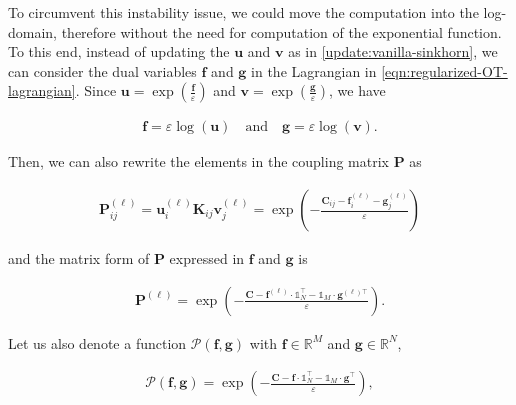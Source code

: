 To circumvent this instability issue, we could move the computation into the log-domain,
therefore without the need for computation of the exponential function.
To this end, instead of updating the $\mathbf{u}$ and $\mathbf{v}$ as in \cref{update:vanilla-sinkhorn},
we can consider the dual variables $\mathbf{f}$ and $\mathbf{g}$ in the Lagrangian in \cref{eqn:regularized-OT-lagrangian}.
Since $\mathbf{u} = \exp \left(\frac{\mathbf{f}}{\varepsilon}\right)$
and $\mathbf{v} = \exp \left(\frac{\mathbf{g}}\varepsilon\right)$, we have

\begin{equation}\label{eqn:fg-expression-as-uv}
  \begin{aligned}
    \mathbf{f} = \varepsilon \log(\mathbf{u})
    \quad\text{and}\quad
    \mathbf{g} = \varepsilon \log(\mathbf{v}).
  \end{aligned}
\end{equation}

Then, we can also rewrite the elements in the coupling matrix $\mathbf{P}$ as

\begin{equation*}
  \begin{aligned}
    \mathbf{P}_{ij}^{(\ell)}
    = \mathbf{u}_i^{(\ell)} \mathbf{K}_{ij} \mathbf{v}_j^{(\ell)}
    = \exp \left(
    -\frac{\mathbf{C}_{ij} - \mathbf{f}^{(\ell)}_i - \mathbf{g}^{(\ell)}_j}{\varepsilon}
    \right)
  \end{aligned}
\end{equation*}

and the matrix form of $\mathbf{P}$ expressed in $\mathbf{f}$ and $\mathbf{g}$ is

\begin{equation}\label{eqn:optimal-coupling-fg}
  \begin{aligned}
    \mathbf{P}^{(\ell)} = \exp \left(
    - \frac{\mathbf{C} - \mathbf{f}^{(\ell)} \cdot \mathbb{1}_N^\top -
      \mathbb{1}_M \cdot \mathbf{g}^{(\ell)\top}}{\varepsilon}
    \right).
  \end{aligned}
\end{equation}

Let us also denote a function $\mathcal{P}(\mathbf{f}, \mathbf{g})$ with
$\mathbf{f} \in \mathbb{R}^M$ and $\mathbf{g} \in \mathbb{R}^N$,

\begin{equation}\label{eqn:function-P}
  \begin{aligned}
    \mathcal{P}(\mathbf{f}, \mathbf{g})
    = \exp \left(
    - \frac{
      \mathbf{C} - \mathbf{f} \cdot \mathbb{1}_N^\top - \mathbb{1}_M \cdot \mathbf{g}^\top
    }{\varepsilon}
    \right),
  \end{aligned}
\end{equation}

